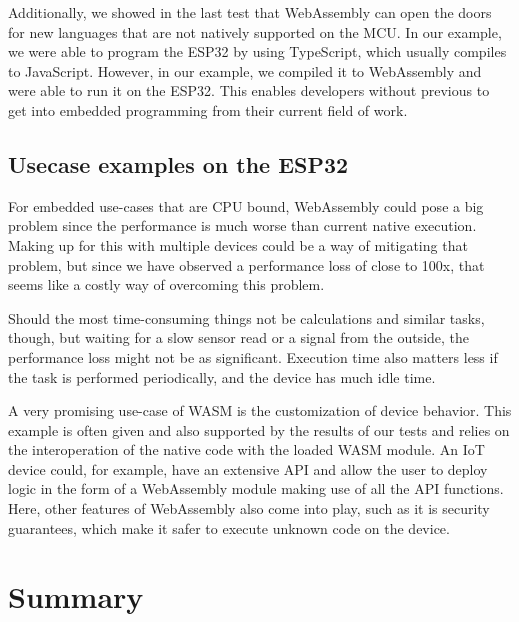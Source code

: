 Additionally, we showed in the last test that WebAssembly can open the doors for new languages that are not natively supported on the MCU. In our example, we were able to program the ESP32 by using TypeScript, which usually compiles to JavaScript. However, in our example, we compiled it to WebAssembly and were able to run it on the ESP32. This enables developers without previous to get into embedded programming from their current field of work.

\subsection{Usecase examples on the ESP32}

For embedded use-cases that are CPU bound, WebAssembly could pose a big problem since the performance is much worse than current native execution. Making up for this with multiple devices could be a way of mitigating that problem, but since we have observed a performance loss of close to 100x, that seems like a costly way of overcoming this problem.

Should the most time-consuming things not be calculations and similar tasks, though, but waiting for a slow sensor read or a signal from the outside, the performance loss might not be as significant. Execution time also matters less if the task is performed periodically, and the device has much idle time.

A very promising use-case of WASM is the customization of device behavior. This example is often given and also supported by the results of our tests and relies on the interoperation of the native code with the loaded WASM module. An IoT device could, for example, have an extensive API and allow the user to deploy logic in the form of a WebAssembly module making use of all the API functions. Here, other features of WebAssembly also come into play, such as it is security guarantees, which make it safer to execute unknown code on the device.

\section{Summary}